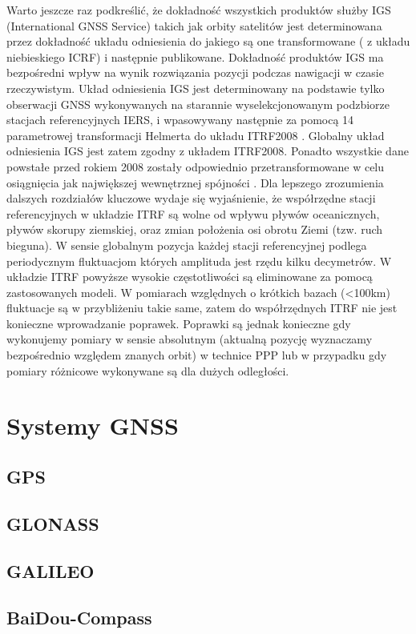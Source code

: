 Warto jeszcze raz podkreślić, że dokładność wszystkich produktów służby IGS (International GNSS Service) takich jak orbity satelitów jest determinowana 
przez dokładność układu odniesienia do jakiego są one transformowane ( z układu niebieskiego ICRF) i następnie publikowane. Dokładność produktów IGS 
ma bezpośredni wpływ na wynik rozwiązania pozycji podczas nawigacji w czasie rzeczywistym.
Układ odniesienia IGS jest determinowany na podstawie tylko obserwacji GNSS wykonywanych na starannie wyselekcjonowanym podzbiorze 
stacjach referencyjnych IERS, i wpasowywany następnie za pomocą 14 parametrowej transformacji Helmerta do układu ITRF2008 \cite[]{ALTAMIMI_2009}.
Globalny układ odniesienia IGS jest zatem zgodny z układem ITRF2008. Ponadto wszystkie dane powstałe przed rokiem 2008 zostały odpowiednio 
przetransformowane w celu osiągnięcia jak największej wewnętrznej spójności \cite[][strona 15]{KOUBA_2009}.
Dla lepszego zrozumienia dalszych rozdziałów kluczowe wydaje się wyjaśnienie, że współrzędne stacji referencyjnych w układzie ITRF 
są wolne od wpływu pływów oceanicznych, pływów skorupy ziemskiej, oraz zmian położenia osi obrotu Ziemi (tzw. ruch bieguna).
W sensie globalnym pozycja każdej stacji referencyjnej podlega periodycznym fluktuacjom których amplituda jest rzędu kilku
decymetrów. W układzie ITRF powyższe wysokie częstotliwości są eliminowane za pomocą zastosowanych modeli. W pomiarach względnych o krótkich
bazach (<100km) fluktuacje są w przybliżeniu takie same, zatem do współrzędnych ITRF nie jest konieczne wprowadzanie poprawek.
Poprawki są jednak konieczne gdy wykonujemy pomiary w sensie absolutnym (aktualną pozycję wyznaczamy bezpośrednio względem znanych orbit)
w technice PPP lub w przypadku gdy pomiary różnicowe wykonywane są dla dużych odległości. \cite[][strona 11]{KOUBA_2009}
\section{Systemy GNSS}
	\subsection{GPS}
	\subsection{GLONASS}
	\subsection{GALILEO}
	\subsection{BaiDou-Compass}
